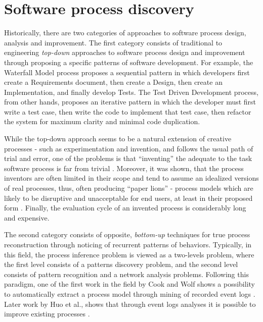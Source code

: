 \section{Software process discovery}
Historically, there are two categories of approaches to software process design, analysis and improvement. 
The first category consists of traditional to engineering \textit{top-down} approaches to software process 
design and improvement through proposing a specific patterns of software development. 
For example, the Waterfall Model process proposes a sequential pattern in which developers first create a 
Requirements document, then create a Design, then create an Implementation, and finally develop Tests. 
The Test Driven Development process, from other hands, proposes an iterative pattern in which
the developer must first write a test case, then write the code to implement that test case, then refactor the 
system for maximum clarity and minimal code duplication. 

While the top-down approach seems to be a natural extension of creative processes - such as experimentation
and invention, and follows the usual path of trial and error, one of the problems is that ``inventing'' the adequate 
to the task software process is far from trivial \cite{citeulike:5043104} \cite{citeulike:1986013}. 
Moreover, it was shown, that the process inventors are often limited in their scope and tend to assume an idealized
versions of real processes, thus, often producing ``paper lions'' - process models which are likely to be disruptive 
and unacceptable for end users, at least in their proposed form \cite{citeulike:9758924}. 
Finally, the evaluation cycle of an invented process is considerably long and expensive. 

The second category consists of opposite, \textit{bottom-up} techniques for true process reconstruction 
through noticing of recurrent patterns of behaviors. Typically, in this field, the process inference problem is viewed 
as a two-levels problem, where the first level consists of a patterns discovery problem, and the 
second level consists of pattern recognition and a network analysis problems.
Following this paradigm, one of the first work in the field by Cook and Wolf
shows a possibility to automatically extract a process model through mining of recorded event logs
\cite{citeulike:328044} \cite{citeulike:5120757} \cite{citeulike:5128143}. 
Later work by Huo et al., shows that through event logs analyses it is possible to improve existing 
processes \cite{citeulike:7691059} \cite{citeulike:7690766}. 

